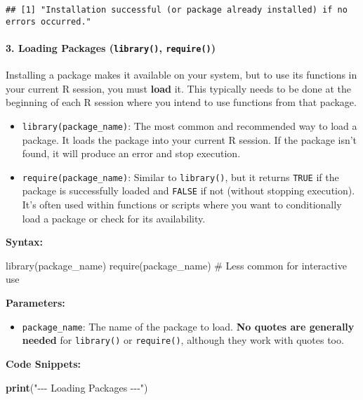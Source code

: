 \documentclass[
]{article}
\newenvironment{Shaded}{\begin{snugshade}}{\end{snugshade}}
\newcommand{\FunctionTok}[1]{\textcolor[rgb]{0.13,0.29,0.53}{\textbf{#1}}}
\newcommand{\NormalTok}[1]{#1}
\newcommand{\StringTok}[1]{\textcolor[rgb]{0.31,0.60,0.02}{#1}}
\providecommand{\tightlist}{%
  \setlength{\itemsep}{0pt}\setlength{\parskip}{0pt}}
\begin{document}
\begin{verbatim}
## [1] "Installation successful (or package already installed) if no errors occurred."
\end{verbatim}

\paragraph{\texorpdfstring{\textbf{3. Loading Packages
(\texttt{library()},
\texttt{require()})}}{3. Loading Packages (library(), require())}}\label{loading-packages-library-require}

Installing a package makes it available on your system, but to use its
functions in your current R session, you must \textbf{load} it. This
typically needs to be done at the beginning of each R session where you
intend to use functions from that package.

\begin{itemize}
\tightlist
\item
  \texttt{library(package\_name)}: The most common and recommended way
  to load a package. It loads the package into your current R session.
  If the package isn't found, it will produce an error and stop
  execution.
\item
  \texttt{require(package\_name)}: Similar to \texttt{library()}, but it
  returns \texttt{TRUE} if the package is successfully loaded and
  \texttt{FALSE} if not (without stopping execution). It's often used
  within functions or scripts where you want to conditionally load a
  package or check for its availability.
\end{itemize}

\textbf{Syntax:}

library(package\_name) require(package\_name) \# Less common for
interactive use

\textbf{Parameters:}

\begin{itemize}
\tightlist
\item
  \texttt{package\_name}: The name of the package to load. \textbf{No
  quotes are generally needed} for \texttt{library()} or
  \texttt{require()}, although they work with quotes too.
\end{itemize}

\textbf{Code Snippets:}

\begin{Shaded}
\begin{Highlighting}[]
\FunctionTok{print}\NormalTok{(}\StringTok{"{-}{-}{-} Loading Packages {-}{-}{-}"}\NormalTok{)}
\end{Highlighting}
\end{Shaded}
\end{document}
